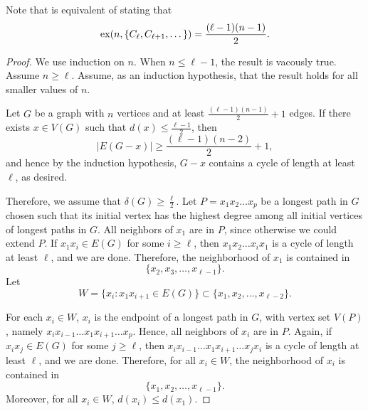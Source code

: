 Note that  is equivalent of stating that
\begin{equation}
    \operatorname{ex}(n, \{C_{\ell}, C_{\ell+1}, \dots\}) = \frac{(\ell - 1)(n-1)}{2}.
\end{equation}

\begin{proof}
    We use induction on \(n\).
    When \(n \leq \ell - 1\),
    the result is vacously true.
    Assume \(n \geq \ell\).
    Assume, as an induction hypothesis, that the result holds for all smaller values of \(n\).

    Let \(G\) be a graph with \(n\) vertices and at least \(\frac{(\ell - 1)(n-1)}{2} + 1\) edges.
    If there exists \(x \in V(G)\) such that \(d(x) \leq \frac{\ell - 1}{2}\),
    then
    \begin{equation}
        |E(G - x)| \geq \frac{(\ell - 1)(n-2)}{2} + 1,
    \end{equation}
    and hence by the induction hypothesis,
    \(G - x\) contains a cycle of length at least \(\ell\),
    as desired.

    Therefore, we assume that \(\delta(G) \geq \frac{\ell}{2}\).
    Let \( P = x_1x_2 \ldots x_p \) be a longest path in \( G \) chosen such that its initial vertex has the highest degree among all initial vertices of longest paths in \( G \).
    All neighbors of \( x_1 \) are in \( P \), since otherwise we could extend \( P \).
    If \(x_1x_i \in E(G)\) for some \(i \geq \ell\), then \(x_1x_2 \ldots x_ix_1\) is a cycle of length at least \(\ell\), and we are done.
    Therefore, the neighborhood of \(x_1\) is contained in 
    \begin{equation}
        \{x_2, x_3, \dots, x_{\ell-1}\}.
    \end{equation}
    Let
    \begin{equation}
        W = \{x_i : x_1x_{i+1} \in E(G)\} \subset \{x_1, x_2, \dots, x_{\ell-2}\}.
    \end{equation}

    For each \(x_i \in W\),
    \(x_i\) is the endpoint of a longest path in \(G\),
    with vertex set \(V(P)\),
    namely \(x_ix_{i-1} \ldots x_1x_{i+1} \ldots x_p\).
    Hence, all neighbors of \(x_i\) are in \(P\).
    Again, if \(x_ix_j \in E(G)\) for some \(j \geq \ell\),
    then \(x_ix_{i-1} \ldots x_1x_{i+1} \ldots x_jx_i\) is a cycle of length at least \(\ell\), and we are done.
    Therefore, for all \(x_i \in W\),
    the neighborhood of \(x_i\) is contained in
    \begin{equation}
        \{x_1, x_2, \dots, x_{\ell-1}\}.
    \end{equation}
    Moreover, for all \(x_i \in W\), \(d(x_i) \leq d(x_1)\).


\end{proof}

